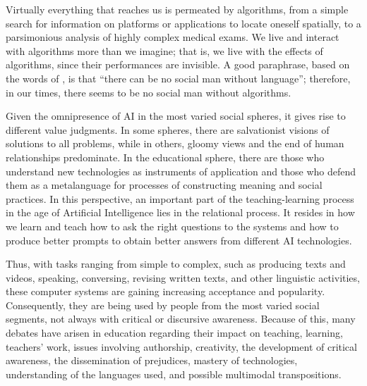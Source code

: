 \documentclass[english]{textolivre}
\begin{document}
Virtually everything that reaches us is permeated by algorithms, from a simple search for information on platforms or applications to locate oneself spatially, to a parsimonious analysis of highly complex medical exams. We live and interact with algorithms more than we imagine; that is, we live with the effects of algorithms, since their performances are invisible. A good paraphrase, based on the words of \textcite[p. 12]{Halliday2004}, is that “there can be no social man without language”; therefore, in our times, there seems to be no social man without algorithms.

Given the omnipresence of AI in the most varied social spheres, it gives rise to different value judgments. In some spheres, there are salvationist visions of solutions to all problems, while in others, gloomy views and the end of human relationships predominate. In the educational sphere, there are those who understand new technologies as instruments of application and those who defend them as a metalanguage for processes of constructing meaning and social practices. In this perspective, an important part of the teaching-learning process in the age of Artificial Intelligence lies in the relational process. It resides in how we learn and teach how to ask the right questions to the systems and how to produce better prompts to obtain better answers from different AI technologies.

Thus, with tasks ranging from simple to complex, such as producing texts and videos, speaking, conversing, revising written texts, and other linguistic activities, these computer systems are gaining increasing acceptance and popularity. Consequently, they are being used by people from the most varied social segments, not always with critical or discursive awareness. Because of this, many debates have arisen in education regarding their impact on teaching, learning, teachers’ work, issues involving authorship, creativity, the development of critical awareness, the dissemination of prejudices, mastery of technologies, understanding of the languages used, and possible multimodal transpositions.
\end{document}
